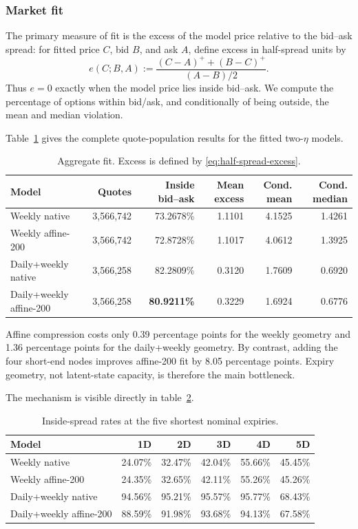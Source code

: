 \documentclass[11pt,a4paper]{article}
\begin{document}
\subsubsection{Market fit}
\label{sec:fit}

The primary measure of fit is the excess of the model price relative to the bid--ask spread:
for fitted price $C$, bid $B$, and ask $A$, define excess in
half-spread units by
\begin{equation}
  e(C;B,A)
  :=\frac{(C-A)^+ +(B-C)^+}{(A-B)/2}.
  \label{eq:half-spread-excess}
\end{equation}
Thus $e=0$ exactly when the model price lies inside bid--ask. We compute the percentage of options within bid/ask, and
conditionally of being outside, the mean and median violation.

Table~\ref{tab:aggregate-fit} gives the complete quote-population results for
the fitted two-$\eta$ models.

\begin{table}[H]
\centering
\small
\begin{tabular}{lrrrrr}
\toprule
Model & Quotes & Inside bid--ask & Mean excess & Cond. mean & Cond. median\\
\midrule
Weekly native & 3,566,742 & 73.2678\% & 1.1101 & 4.1525 & 1.4261\\
Weekly affine-200 & 3,566,742 & 72.8728\% & 1.1017 & 4.0612 & 1.3925\\
Daily+weekly native & 3,566,258 & 82.2809\% & 0.3120 & 1.7609 & 0.6920\\
Daily+weekly affine-200 & 3,566,258 & \textbf{80.9211\%} & 0.3229 & 1.6924 & 0.6776\\
\bottomrule
\end{tabular}
\caption{Aggregate fit. Excess is defined by \eqref{eq:half-spread-excess}.}
\label{tab:aggregate-fit}
\end{table}

Affine compression costs only 0.39 percentage points for the weekly geometry
and 1.36 percentage points for the daily+weekly geometry.  By contrast, adding
the four short-end nodes improves affine-200 fit by 8.05 percentage points.
Expiry geometry, not latent-state capacity, is therefore the main bottleneck.

The mechanism is visible directly in table~\ref{tab:short-fit}.

\begin{table}[H]
\centering
\begin{tabular}{lrrrrr}
\toprule
Model & 1D & 2D & 3D & 4D & 5D\\
\midrule
Weekly native & 24.07\% & 32.47\% & 42.04\% & 55.66\% & 45.45\%\\
Weekly affine-200 & 24.35\% & 32.65\% & 42.11\% & 55.26\% & 45.26\%\\
Daily+weekly native & 94.56\% & 95.21\% & 95.57\% & 95.77\% & 68.43\%\\
Daily+weekly affine-200 & 88.59\% & 91.98\% & 93.68\% & 94.13\% & 67.58\%\\
\bottomrule
\end{tabular}
\caption{Inside-spread rates at the five shortest nominal expiries.}
\label{tab:short-fit}
\end{table}
\end{document}
